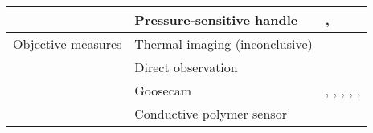 \begin{table}[t!]
\begin{threeparttable}
\begin{tabular*}{\textwidth}{
    >{\raggedright}p{}
    >{\raggedright}p{}
    >{\raggedright\arraybackslash}p{}}
\cline{2-3}
& Pressure-sensitive handle & 
    \textcite{grunkina2017}, \textcite{klepzig2020} \\ 
    
\hline
Objective measures & Thermal imaging (inconclusive) & 
    \textcite{panksepp2002} \\
    
\cline{2-3}
& Direct observation & 
    \textcite{craig2005} \\
                           
\cline{2-3}
& Goosecam & 
    \textcite{benedek2010}, \textcite{benedek2011}, \textcite{quesnel2018}, \textcite{sumpf2015}, \textcite{wassiliwizky2017a}, \textcite{wassiliwizky2017b} \\
    
\cline{2-3}
& Conductive polymer sensor & 
    \textcite{kim2014} \\
    
\hline

\end{tabular*}
\end{threeparttable}
\end{table}